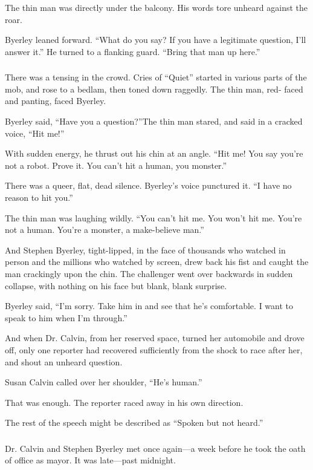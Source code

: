 \documentclass[10pt,a5paper,twoside]{book}
\begin{document}
The thin man was directly under the balcony. His words tore unheard against the roar.

Byerley leaned forward. “What do you say? If you have a legitimate question, I’ll answer it.” He turned to a flanking guard. “Bring that man up here.”

\subsubsection*{}
There was a tensing in the crowd. Cries of “Quiet” started in various parts of the mob, and rose to a bedlam, then toned down raggedly. The thin man, red- faced and panting, faced Byerley.

Byerley said, “Have you a question?”The thin man stared, and said in a cracked voice, “Hit me!”

With sudden energy, he thrust out his chin at an angle. “Hit me! You say you’re not a robot. Prove it. You can’t hit a human, you monster.”

There was a queer, flat, dead silence. Byerley’s voice punctured it. “I have no reason to hit you.”

The thin man was laughing wildly. “You can’t hit me. You won’t hit me. You’re not a human. You’re a monster, a make-believe man.”

And Stephen Byerley, tight-lipped, in the face of thousands who watched in person and the millions who watched by screen, drew back his fist and caught the man crackingly upon the chin. The challenger went over backwards in sudden collapse, with nothing on his face but blank, blank surprise.

Byerley said, “I’m sorry. Take him in and see that he’s comfortable. I want to speak to him when I’m through.”

And when Dr. Calvin, from her reserved space, turned her automobile and drove off, only one reporter had recovered sufficiently from the shock to race after her, and shout an unheard question.

Susan Calvin called over her shoulder, “He’s human.”

That was enough. The reporter raced away in his own direction.

The rest of the speech might be described as “Spoken but not heard.”

\subsubsection*{}
Dr. Calvin and Stephen Byerley met once again—a week before he took the oath of office as mayor. It was late—past midnight.
\end{document}
